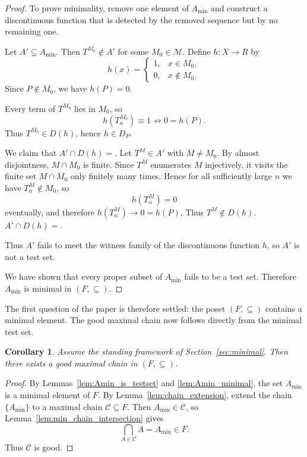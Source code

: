 \documentclass[11pt]{amsart}
\theoremstyle{plain}
\newtheorem{corollary}[theorem]{Corollary}
\theoremstyle{definition}
\theoremstyle{remark}
\newcommand{\Dp}{\mathcal{D}_P}
\newcommand{\F}{\mathcal{F}}
\newcommand{\R}{\mathbb{R}}
\def\Dp{D_P}%
\def\F{F}%
\def\R{R}%
\def\emptyset{}%
\begin{document}
\begin{proof}
To prove minimality, remove one element of $A_{\min}$ and construct a discontinuous function that is detected by the removed sequence but by no remaining one.

Let $A'\subsetneq A_{\min}$.
Then $T^{M_0}\notin A'$ for some $M_0\in\mathcal M$.
Define $h:X\to\R$ by
\[
h(x)=
\begin{cases}
1, & x\in M_0,\\
0, & x\notin M_0.
\end{cases}
\]
Since $P\notin M_0$, we have $h(P)=0$.

Every term of $T^{M_0}$ lies in $M_0$, so
\[
h(T^{M_0}_n)\equiv 1\not\to 0=h(P).
\]
Thus $T^{M_0}\in D(h)$, hence $h\in\Dp$.

We claim that $A'\cap D(h)=\emptyset$.
Let $T^M\in A'$ with $M\neq M_0$.
By almost disjointness, $M\cap M_0$ is finite.
Since $T^M$ enumerates $M$ injectively, it visits the finite set $M\cap M_0$ only finitely many times.
Hence for all sufficiently large $n$ we have $T^M_n\notin M_0$, so
\[
h(T^M_n)=0
\]
eventually, and therefore $h(T^M_n)\to 0=h(P)$.
Thus $T^M\notin D(h)$. $A'\cap D(h)=\emptyset$.

Thus $A'$ fails to meet the witness family of the discontinuous function $h$, so $A'$ is not a test set.

We have shown that every proper subset of $A_{\min}$ fails to be a test set.
Therefore $A_{\min}$ is minimal in $(\F,\subseteq)$.
\end{proof}

The first question of the paper is therefore settled:
the poset $(\F,\subseteq)$ contains a minimal element.
The good maximal chain now follows directly from the minimal test set.

\begin{corollary}\label{cor:good_chain_exists_T1}
Assume the standing framework of Section~\ref{sec:minimal}.
Then there exists a good maximal chain in $(\F,\subseteq)$.
\end{corollary}

\begin{proof}
By Lemmas~\ref{lem:Amin_is_testset} and \ref{lem:Amin_minimal}, the set $A_{\min}$ is a minimal element of $\F$.
By Lemma~\ref{lem:chain_extension}, extend the chain $\{A_{\min}\}$ to a maximal chain $\mathcal C\subseteq\F$.
Then $A_{\min}\in\mathcal C$, so Lemma~\ref{lem:min_chain_intersection} gives
\[
\bigcap_{A\in\mathcal C}A=A_{\min}\in\F.
\]
Thus $\mathcal C$ is good.
\end{proof}
\end{document}
